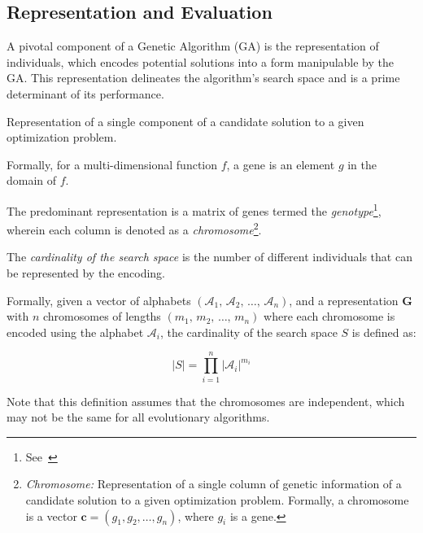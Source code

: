 \subsection{Representation and Evaluation}
\label{sec:bg:ga:repr}
    A pivotal component of a Genetic Algorithm (GA) is the representation of individuals, which encodes potential 
    solutions into a form manipulable by the GA. This representation delineates the algorithm's search space and is a 
    prime determinant of its performance.

    \begin{definition}[Gene]
    \label{def:gene}
        Representation of a single component of a candidate solution to a given optimization problem.
    
        Formally, for a multi-dimensional function \(f\), a gene is an element \(g\) in the domain of \(f\).
    \end{definition}

    The predominant representation is a matrix of genes termed the \emph{genotype}\footnote{
        See~\autocite{wilhelmstotterJeneticsJavaGenetica}
    }, wherein each column is denoted as a \emph{chromosome}\footnote{
        \emph{Chromosome:} Representation of a single column of genetic information of a candidate solution to a given 
        optimization problem. Formally, a chromosome is a vector \(\textbf{c} = (g_1, g_2, \dots, g_n)\), where \(g_i\) 
        is a gene.
    }.

    \begin{definition}
    \label{def:cardinality_of_the_search_space}
        The \emph{cardinality of the search space} is the number of different individuals that can be represented by 
        the encoding.

        Formally, given a vector of alphabets \((\mathcal{A}_1,\, \mathcal{A}_2,\, \dots,\, \mathcal{A}_n)\), and a 
        representation \(\mathbf{G}\) with \(n\) chromosomes of lengths \((m_1,\, m_2,\, \dots,\, m_n)\) where each 
        chromosome is encoded using the alphabet \(\mathcal{A}_i\), the cardinality of the search space \(S\) is 
        defined as:
        
        \begin{equation}
        \label{eq:cardinality_of_the_search_space}
            |S| = \prod_{i=1}^n |\mathcal{A}_i|^{m_i}
        \end{equation}

        Note that this definition assumes that the chromosomes are independent, which may not be the same for all 
        evolutionary algorithms.
    \end{definition}

